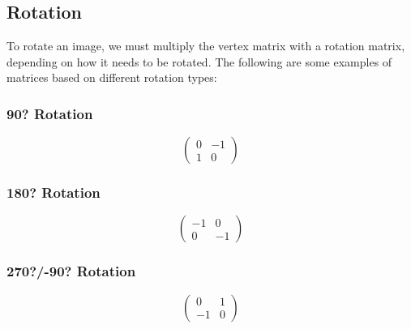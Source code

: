 \documentclass[a4paper,10pt]{article}
\begin{document}
	\newpage

      \subsection{Rotation}
        To rotate an image, we must multiply the vertex matrix with a rotation matrix, depending on how it needs to be rotated. The following are some examples of matrices based on different rotation types:
        \subsubsection{90? Rotation}
          \begin{equation*}
            \begin{pmatrix}
              0 & -1\\1 & 0
            \end{pmatrix}
          \end{equation*}

        \subsubsection{180? Rotation}
          \begin{equation*}
            \begin{pmatrix}
              -1 & 0\\0 & -1
            \end{pmatrix}
          \end{equation*}

        \subsubsection{270?/-90? Rotation}
          \begin{equation*}
            \begin{pmatrix}
              0 & 1\\-1 & 0
            \end{pmatrix}
          \end{equation*}
\end{document}
